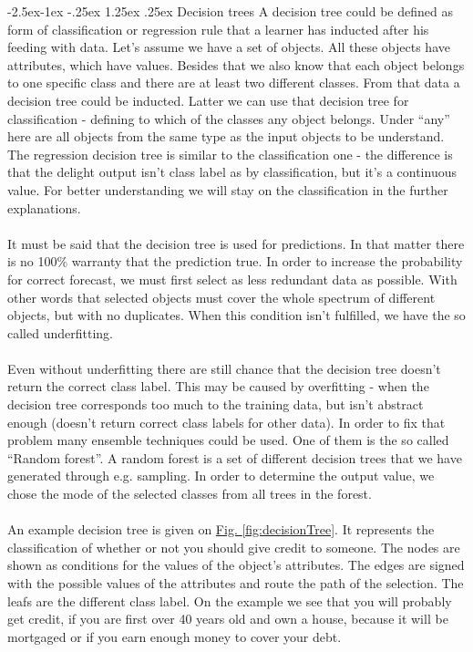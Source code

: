 \documentclass[runningheads,a4paper]{llncs}[2015/06/24]
\makeatletter
\renewcommand\paragraph{\@startsection{paragraph}{4}{\z@}%
            {-2.5ex\@plus -1ex \@minus -.25ex}%
            {1.25ex \@plus .25ex}%
            {\normalfont\normalsize\bfseries}}
\makeatother
\begin{document}
\paragraph{Decision trees}
 A decision tree could be defined as form of classification or regression rule that a learner has inducted after his feeding with data. Let's assume we have a set of objects. All these objects have attributes, which  have values. Besides that we also know that each object belongs to one specific class and there are at least two different classes. From that data a decision tree could be inducted. Latter we can use that decision tree for classification - defining to which of the classes any object belongs. Under \enquote{any} here are all objects from the same type as the input objects to be understand. The regression decision tree is similar to the classification one - the difference is that the delight output isn't class label as by classification, but it's a continuous value. For better understanding we will stay on the classification in the further explanations\cite{quinlan1986induction}.\\\\It must be said that the decision tree is used for predictions. In that matter there is no 100\% warranty that the prediction true. In order to increase the probability for correct forecast, we must first select as less redundant data as possible. With other words that selected objects must cover the whole spectrum of different objects, but with no duplicates. When this condition isn't fulfilled, we have the so called underfitting\cite{quinlan1986induction}.\\\\
Even without underfitting there are still chance that the decision tree doesn't return the correct class label. This may be caused by overfitting - when the decision tree corresponds too much to the training data, but isn't abstract enough (doesn't return correct class labels for other data). In order to fix that problem many ensemble techniques could be used. One of them is the so called \enquote{Random forest}. A random forest is a set of different decision trees that we have generated through e.g. sampling. In order to determine the output value, we chose the mode of the selected classes from all trees in the forest\cite{breiman2001random}.\\\\
An example decision tree is given on \hyperref[fig:decisionTree]{Fig. \ref{fig:decisionTree}}. It represents the classification of whether or not you should give credit to someone. The nodes are shown as conditions for the values of the object's attributes. The edges are signed with the possible values of the attributes and route the path of the selection. The leafs are the different class label. On the example we see that you will probably get credit, if you are first over 40 years old and own a house, because it will be mortgaged or if you earn enough money to cover your debt.   
    
\end{document}
